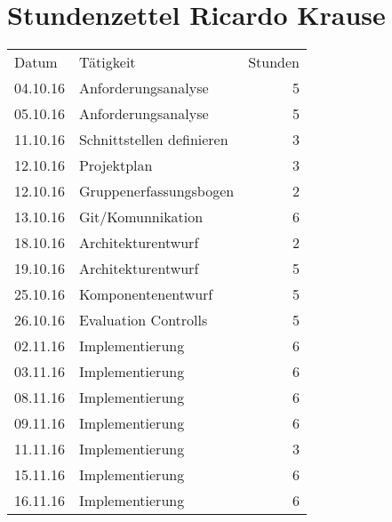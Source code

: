 \chapter{Stundenzettel Ricardo Krause}
\begin{minipage}{0.5\textwidth}
    \begin{tabular}{llr}
       Datum& Tätigkeit&Stunden\\
       
       04.10.16&Anforderungsanalyse&5 \\
       05.10.16&Anforderungsanalyse&5 \\
       11.10.16&Schnittstellen definieren&3 \\
       12.10.16&Projektplan&3 \\
       12.10.16&Gruppenerfassungsbogen&2\\
       13.10.16&Git/Komunnikation &6\\
       18.10.16&Architekturentwurf&2 \\
       19.10.16&Architekturentwurf&5 \\
       25.10.16&Komponentenentwurf&5 \\
       26.10.16&Evaluation Controlls&5 \\
       02.11.16&Implementierung&6 \\
       03.11.16&Implementierung&6 \\
       08.11.16&Implementierung&6 \\
       09.11.16&Implementierung&6 \\
       11.11.16&Implementierung&3 \\
       15.11.16&Implementierung&6 \\
       16.11.16&Implementierung&6 \\



    \end{tabular}
\end{minipage}
